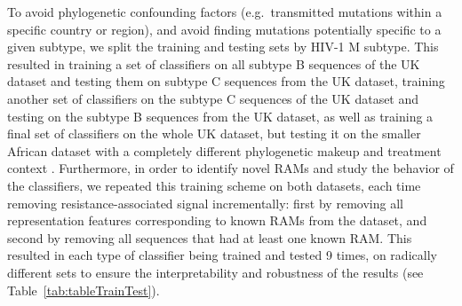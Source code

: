 \documentclass[
  11,
]{scrbook}
\begin{document}
To avoid phylogenetic confounding factors (e.g.~transmitted mutations
within a specific country or region), and avoid finding mutations
potentially specific to a given subtype, we split the training and
testing sets by HIV-1 M subtype. This resulted in training a set of
classifiers on all subtype B sequences of the UK dataset and testing
them on subtype C sequences from the UK dataset, training another set of
classifiers on the subtype C sequences of the UK dataset and testing on
the subtype B sequences from the UK dataset, as well as training a final
set of classifiers on the whole UK dataset, but testing it on the
smaller African dataset with a completely different phylogenetic makeup
and treatment context \autocite{villabona-arenasIndepthAnalysisHIV12016}.
Furthermore, in order to identify novel RAMs and study the behavior of
the classifiers, we repeated this training scheme on both datasets, each
time removing resistance-associated signal incrementally: first by
removing all representation features corresponding to known RAMs from
the dataset, and second by removing all sequences that had at least one
known RAM. This resulted in each type of classifier being trained and
tested 9 times, on radically different sets to ensure the
interpretability and robustness of the results (see
Table~\ref{tab:tableTrainTest}).
\end{document}

